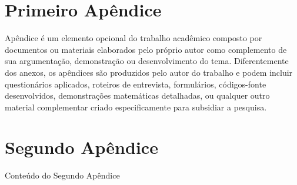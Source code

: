 \begin{apendicesenv}

\chapter{Primeiro Apêndice}

Apêndice é um elemento opcional do trabalho acadêmico composto por documentos ou materiais elaborados pelo próprio autor como complemento de sua argumentação, demonstração ou desenvolvimento do tema. Diferentemente dos anexos, os apêndices são produzidos pelo autor do trabalho e podem incluir questionários aplicados, roteiros de entrevista, formulários, códigos-fonte desenvolvidos, demonstrações matemáticas detalhadas, ou qualquer outro material complementar criado especificamente para subsidiar a pesquisa.

\chapter{Segundo Apêndice}

Conteúdo do Segundo Apêndice

\end{apendicesenv}
